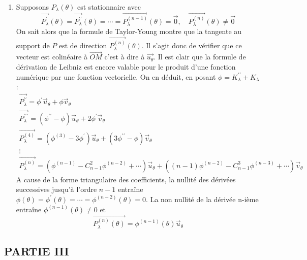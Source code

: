\begin{enumerate}
\item  Supposons $P_{\lambda }(\theta )$ est stationnaire avec
\[
\overrightarrow{P_{\lambda }^{\prime }}(\theta )=\overrightarrow{P_{\lambda
}^{\prime \prime }}(\theta )=\cdots =\overrightarrow{P_{\lambda }^{(n-1)}}%
(\theta )=\overrightarrow{0},\quad \overrightarrow{P_{\lambda }^{(n)}}%
(\theta )\neq \overrightarrow{0} 
\]
On sait alors que la formule de Taylor-Young montre que la tangente au
support de $P$ est de direction $\overrightarrow{P_{\lambda }^{(n)}}(\theta
) $. Il s'agit donc de v\'{e}rifier que ce vecteur est colin\'{e}aire \`{a} $%
\overrightarrow{OM}$ c'est \`{a} dire \`{a} $\overrightarrow{u_{\theta }}$.%
\newline
Il est clair que la formule de d\'{e}rivation de Leibniz est encore valable
pour le produit d'une fonction num\'{e}rique par une fonction vectorielle.
On en d\'{e}duit, en posant $\phi =K_{\lambda }^{\prime \prime }+K_{\lambda
} $ : 
\begin{eqnarray*}
\overrightarrow{P_{\lambda }^{\prime \prime }}=\phi ^{\prime }%
\overrightarrow{u}_{\theta }+\phi \overrightarrow{v}_{\theta } \\
\overrightarrow{P_{\lambda }^{\prime \prime \prime }}=(\phi ^{\prime \prime
}-\phi )\overrightarrow{u}_{\theta }+2\phi ^{\prime }\overrightarrow{v}%
_{\theta } \\
\overrightarrow{P_{\lambda }^{(4)}}=(\phi ^{(3)}-3\phi ^{\prime })%
\overrightarrow{u}_{\theta }+(3\phi ^{\prime \prime }-\phi )\overrightarrow{v%
}_{\theta } \\
\vdots \\
\overrightarrow{P_{\lambda }^{(n)}}=(\phi ^{(n-1)}-C_{n-1}^{2}\phi
^{(n-2)}+\cdots )\overrightarrow{u}_{\theta }+((n-1)\phi
^{(n-2)}-C_{n-1}^{3}\phi ^{(n-3)}+\cdots )\overrightarrow{v}_{\theta }
\end{eqnarray*}
A cause de la forme triangulaire des coefficients, la nullit\'{e} des
d\'{e}riv\'{e}es successives jusqu'\`{a} l'ordre $n-1$ entra\^{i}ne $\phi
(\theta )=\phi ^{\prime }(\theta )=\cdots =\phi ^{(n-2)}(\theta )=0.$ La non
nullit\'{e} de la d\'{e}riv\'{e}e n-i\`{e}me entra\^{i}ne $\phi
^{(n-1)}(\theta )\neq 0$ et 
\[
\overrightarrow{P_{\lambda }^{(n)}(\theta )}=\phi ^{(n-1)}(\theta )%
\overrightarrow{u}_{\theta } 
\]
\end{enumerate}

\subsection*{PARTIE III}

